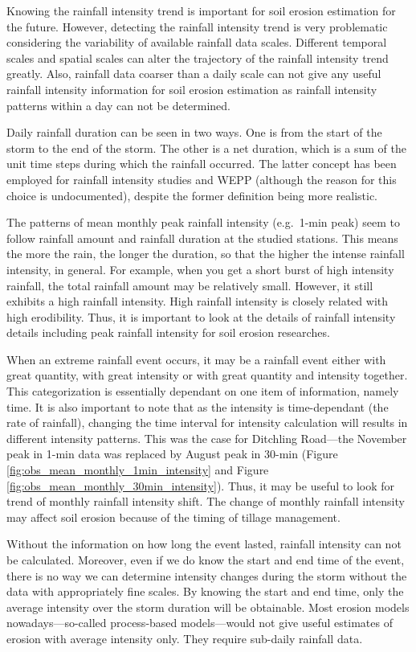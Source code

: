 Knowing the rainfall intensity trend is important for soil erosion estimation
for the future. However, detecting the rainfall intensity trend is very
problematic considering the variability of available rainfall data scales.
Different temporal scales and spatial scales can alter the trajectory of the
rainfall intensity trend greatly. Also, rainfall data coarser than a daily scale
can not give any useful rainfall intensity information for soil erosion
estimation as rainfall intensity patterns within a day can not be determined.

Daily rainfall duration can be seen in two ways. One is from the start of the
storm to the end of the storm. The other is a net duration, which is a sum of
the unit time steps during which the rainfall occurred. The latter concept has
been employed for rainfall intensity studies and WEPP (although the reason for
this choice is undocumented), despite the former definition being more
realistic.

The patterns of mean monthly peak rainfall intensity (e.g.\ 1-min peak) seem to
follow rainfall amount and rainfall duration at the studied stations. This means
the more the rain, the longer the duration, so that the higher the intense
rainfall intensity, in general. For example, when you get a short burst of high
intensity rainfall, the total rainfall amount may be relatively small. However,
it still exhibits a high rainfall intensity. High rainfall intensity is closely
related with high erodibility. Thus, it is important to look at the details of
rainfall intensity details including peak rainfall intensity for soil erosion
researches.

When an extreme rainfall event occurs, it may be a rainfall event either with
great quantity, with great intensity or with great quantity and intensity
together. This categorization is essentially dependant on one item of
information, namely time. It is also important to note that as the intensity is
time-dependant (the rate of rainfall), changing the time interval for intensity
calculation will results in different intensity patterns. This was the case for
Ditchling Road---the November peak in 1-min data was replaced by August peak in
30-min (Figure \ref{fig:obs_mean_monthly_1min_intensity} and Figure
\ref{fig:obs_mean_monthly_30min_intensity}). Thus, it may be useful to look for
trend of monthly rainfall intensity shift. The change of monthly rainfall
intensity may affect soil erosion because of the timing of tillage management.

Without the information on how long the event lasted, rainfall intensity can not
be calculated. Moreover, even if we do know the start and end time of the event,
there is no way we can determine intensity changes during the storm without the
data with appropriately fine scales. By knowing the start and end time, only the
average intensity over the storm duration will be obtainable. Most erosion
models nowadays---so-called process-based models---would not give useful
estimates of erosion with average intensity only. They require sub-daily
rainfall data.


